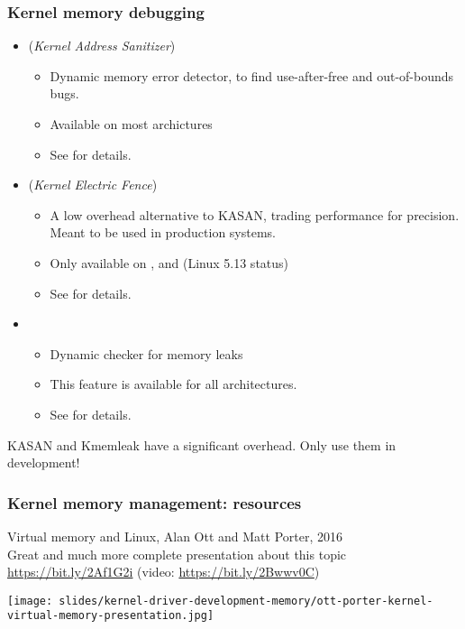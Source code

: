 \begin{frame}
  \frametitle{Kernel memory debugging}
  \begin{itemize}
  \item {} ({\em Kernel Address Sanitizer})
    \begin{itemize}
    \item Dynamic memory error detector, to find use-after-free and
      out-of-bounds bugs.
    \item Available on most archictures
    \item See  for details.
    \end{itemize}
  \item {} ({\em Kernel Electric Fence})
    \begin{itemize}
    \item A low overhead alternative to KASAN, trading performance
	  for precision. Meant to be used in production systems.
    \item Only available on ,  and 
          (Linux 5.13 status)
    \item See  for details.
    \end{itemize}
  \item {}
    \begin{itemize}
    \item Dynamic checker for memory leaks
    \item This feature is available for all architectures.
    \item See  for details.
    \end{itemize}
  \end{itemize}
  KASAN and Kmemleak have a significant overhead. Only use them in development!
\end{frame}

\begin{frame}
  \frametitle{Kernel memory management: resources}
  Virtual memory and Linux, Alan Ott and Matt Porter, 2016\\
  Great and much more complete presentation about this topic\\
  \url{https://bit.ly/2Af1G2i} (video: \url{https://bit.ly/2Bwwv0C})
  \begin{center}
     \texttt{[image: slides/kernel-driver-development-memory/ott-porter-kernel-virtual-memory-presentation.jpg]}
  \end{center}
\end{frame}
